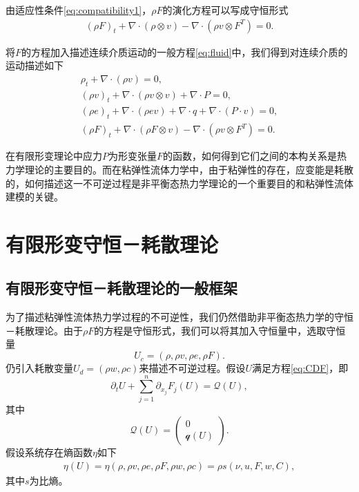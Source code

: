由适应性条件\eqref{eq:compatibility1}，$\rho F$的演化方程可以写成守恒形式
\begin{eqnarray*}
(\rho F)_t + \nabla \cdot (\rho \otimes v) - \nabla \cdot (\rho v \otimes F^T) = 0 .
\end{eqnarray*} 

将$F$的方程加入描述连续介质运动的一般方程\eqref{eq:fluid}中，我们得到对连续介质的运动描述如下
\begin{subequations}\label{eq:continuum}
\begin{align}
\rho_t + \nabla \cdot (\rho v )=0, \\
(\rho v)_t + \nabla \cdot (\rho v \otimes v) + \nabla \cdot P = 0, \\
(\rho e)_t + \nabla \cdot (\rho e v) + \nabla \cdot q + \nabla \cdot (P \cdot v) = 0 ,\\
(\rho F)_t + \nabla \cdot (\rho F \otimes v) - \nabla \cdot (\rho v \otimes F^T) = 0 .
\end{align}
\end{subequations}

在有限形变理论中应力$P$为形变张量$F$的函数，如何得到它们之间的本构关系是热力学理论的主要目的。而在粘弹性流体力学中，由于粘弹性的存在，应变能是耗散的，如何描述这一不可逆过程是非平衡态热力学理论的一个重要目的和粘弹性流体建模的关键。

\section{有限形变守恒－耗散理论}
\subsection{有限形变守恒－耗散理论的一般框架}
为了描述粘弹性流体热力学过程的不可逆性，我们仍然借助非平衡态热力学的守恒－耗散理论。由于$\rho F$的方程是守恒形式，我们可以将其加入守恒量中，选取守恒量
$$U_c = (\rho, \rho v, \rho e, \rho F).$$
仍引入耗散变量$U_d = (\rho w,\rho c)$来描述不可逆过程。假设$U$满足方程\eqref{eq:CDF}，即
\begin{equation}\label{eq:FCDF}
		\partial_t U + \sum_{j=1}^n \partial_{x_j} F_j(U) = \mathcal{Q} (U) ,
\end{equation}
其中
\begin{equation*}
	\mathcal{Q}(U) = \left( \begin{matrix}
		0 \\ \mathcal{q}(U)
	\end{matrix} \right).
\end{equation*}
假设系统存在熵函数$\eta$如下
\begin{eqnarray*}
\eta(U) = \eta(\rho, \rho v, \rho e,\rho F,\rho w, \rho c) = \rho s(\nu,u,F,w,C),
\end{eqnarray*}
其中$s$为比熵。

